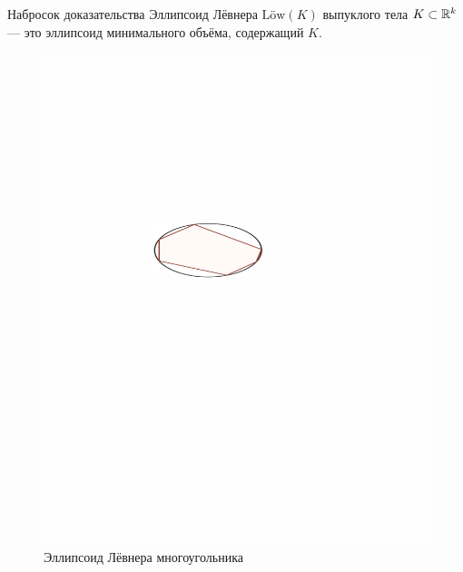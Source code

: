 \documentclass{beamer}
\def\low{\text{L\"ow}}
\begin{document}
\begin{frame}{Набросок доказательства}
	Эллипсоид Лёвнера $\low(K)$ выпуклого тела $K\subset\mathbb {R}^k$ --- это эллипсоид минимального объёма, содержащий $K$.
	\begin{figure}[h!]
		\begin{center}
			\includegraphics[scale=0.7]{pics/loewner.pdf}
			\caption{Эллипсоид Лёвнера многоугольника}
		\end{center}
	\end{figure}
\end{frame}
\end{document}
